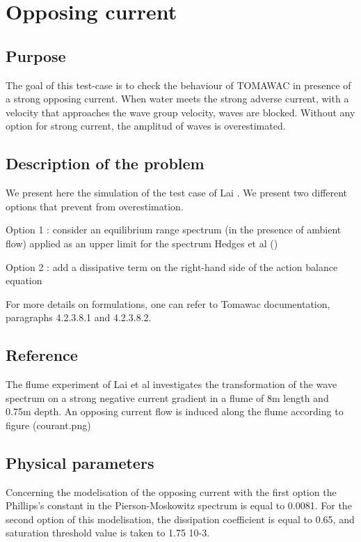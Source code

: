 \section{Opposing current}
%

%
\subsection{Purpose}
%
The goal of this test-case is to check the behaviour of TOMAWAC in presence of a strong opposing current. When water meets the strong adverse current, with a velocity that approaches the wave group velocity, waves are blocked. Without any option for strong current, the amplitud of waves is overestimated.

%
\subsection{Description of the problem}
%
We present here the simulation of the test case of Lai \cite{Lai1989}. We present two different options that prevent from overestimation.

Option 1 : consider an equilibrium range spectrum (in the presence of ambient flow) applied as an upper limit for the spectrum Hedges et al  (\cite{Hedges1985})

Option 2 : add a dissipative term on the right-hand side of the action balance equation \cite{Westhuys2012}

For more details on formulations, one can refer to Tomawac documentation, paragraphs 4.2.3.8.1 and 4.2.3.8.2.

%
\subsection{Reference}
%
The flume experiment of Lai et al \cite{Lai1989} investigates the transformation of the wave spectrum on a strong negative current gradient in a flume of 8m length and 0.75m depth. An opposing current flow is induced along the flume according to figure (courant.png)

\subsection{Physical parameters}
 Concerning the modelisation of the opposing current with the first option the Phillips’s constant in the Pierson-Moskowitz spectrum is equal to 0.0081.
For the second option of this modelisation, the dissipation coefficient is equal to 0.65, and saturation threshold value is taken to 1.75 10-3.

